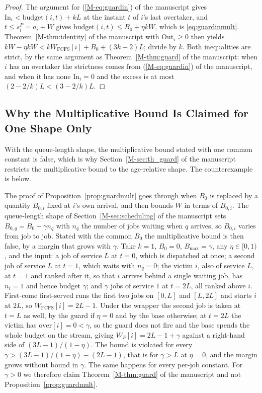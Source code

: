 \documentclass[mathematics,supfile,submit,moreauthors]{Definitions/mdpi}
\begin{document}
\begin{proof}
The argument for (\ref*{M-eq:guardin}) of the manuscript gives
$\mathrm{In}_i < \mathrm{budget}(i,t) + kL$ at the instant $t$ of $i$'s last
overtaker, and $t \le s^P_i = a_i + W$ gives
$\mathrm{budget}(i,t) \le B_0 + \eta k W$, which is \eqref{eq:guardinmult}.
Theorem~\ref*{M-thm:identity} of the manuscript with $\mathrm{Out}_i \ge 0$ then yields
$kW - \eta k W < k W_{\mathrm{FCFS}}[i] + B_0 + (3k-2)L$; divide by $k$. Both
inequalities are strict, by the same argument as Theorem~\ref*{M-thm:guard} of the manuscript: when
$i$ has an overtaker the strictness comes from (\ref*{M-eq:guardin}) of the manuscript, and when it
has none $\mathrm{In}_i = 0$ and the excess is at most $(2-2/k)L < (3-2/k)L$.
\end{proof}

\subsection{Why the Multiplicative Bound Is Claimed for One Shape Only}
\label{sec:supp_multscope}

With the queue-length shape, the multiplicative bound stated with one common constant is
false, which is why Section~\ref*{M-sec:th_guard} of the manuscript restricts the multiplicative bound to
the age-relative shape. The counterexample is below.

\begin{remark}
\label{rem:mult_scope}
The proof of Proposition~\ref{prop:guardmult} goes through when $B_0$ is replaced by a
quantity $B_{0,i}$ fixed at $i$'s own arrival, and then bounds $W$ in terms of $B_{0,i}$. The queue-length shape of Section~\ref*{M-sec:scheduling} of the manuscript sets
$B_{0,q} = B_0 + \gamma n_q$ with $n_q$ the number of jobs waiting when $q$
arrives, so $B_{0,i}$ varies from job to job. Stated with the common $B_0$ the
multiplicative bound is then false, by a margin that grows with $\gamma$. Take
$k = 1$, $B_0 = 0$, $B_{\max} = \gamma$, any $\eta \in [0,1)$, and the input: a
job of service $L$ at $t = 0$, which is dispatched at once; a second job of
service $L$ at $t = 1$, which waits with $n_q = 0$; the victim $i$, also of
service $L$, at $t = 1$ and ranked after it, so that $i$ arrives behind a single
waiting job, has $n_i = 1$ and hence budget $\gamma$; and $\gamma$ jobs of
service $1$ at $t = 2L$, all ranked above $i$. First-come first-served runs the
first two jobs on $[0,L]$ and $[L,2L]$ and starts $i$ at $2L$, so
$W_{\mathrm{FCFS}}[i] = 2L-1$. Under the wrapper the second job is taken at
$t = L$ as well, by the guard if $\eta = 0$ and by the base otherwise; at
$t = 2L$ the victim has
$\mathrm{over}[i] = 0 < \gamma$, so the guard does not fire and the base spends
the whole budget on the stream, giving $W_P[i] = 2L - 1 + \gamma$ against a
right-hand side of $(3L-1)/(1-\eta)$. The bound is violated for every
$\gamma > (3L-1)/(1-\eta) - (2L-1)$, that is for $\gamma > L$ at $\eta = 0$, and
the margin grows without bound in $\gamma$. The same happens for
every per-job constant. For $\gamma > 0$ we therefore claim
Theorem~\ref*{M-thm:guard} of the manuscript and not Proposition~\ref{prop:guardmult}.
\end{remark}
\end{document}
